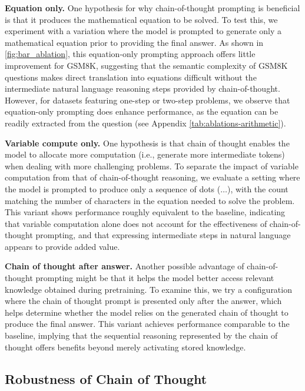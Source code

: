 \textbf{Equation only.} One hypothesis for why chain-of-thought prompting is beneficial is that it produces the mathematical equation to be solved. To test this, we experiment with a variation where the model is prompted to generate only a mathematical equation prior to providing the final answer. 
As shown in \cref{fig:bar_ablation}, this equation-only prompting approach offers little improvement for GSM8K, suggesting that the semantic complexity of GSM8K questions makes direct translation into equations difficult without the intermediate natural language reasoning steps provided by chain-of-thought. However, for datasets featuring one-step or two-step problems, we observe that equation-only prompting does enhance performance, as the equation can be readily extracted from the question (see Appendix \cref{tab:ablations-arithmetic}).


\textbf{Variable compute only.} One hypothesis is that chain of thought enables the model to allocate more computation (i.e., generate more intermediate tokens) when dealing with more challenging problems. To separate the impact of variable computation from that of chain-of-thought reasoning, we evaluate a setting where the model is prompted to produce only a sequence of dots ($\ldots$), with the count matching the number of characters in the equation needed to solve the problem. This variant shows performance roughly equivalent to the baseline, indicating that variable computation alone does not account for the effectiveness of chain-of-thought prompting, and that expressing intermediate steps in natural language appears to provide added value.

\textbf{Chain of thought after answer.} Another possible advantage of chain-of-thought prompting might be that it helps the model better access relevant knowledge obtained during pretraining. To examine this, we try a configuration where the chain of thought prompt is presented only after the answer, which helps determine whether the model relies on the generated chain of thought to produce the final answer. This variant achieves performance comparable to the baseline, implying that the sequential reasoning represented by the chain of thought offers benefits beyond merely activating stored knowledge.


\subsection{Robustness of Chain of Thought}\label{subsec:robustness}

